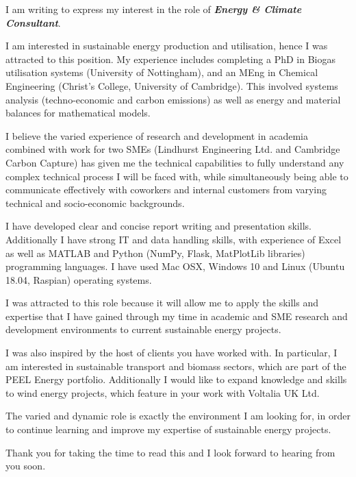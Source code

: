\documentclass[11pt,a4paper]{SandyCV} %
\begin{document}
\makeCoverLetterName

\makelettertitle %

\begin{cvletter} %

\hspace{2.8cm} I am writing to express my interest in the role of \emph{\bf Energy \& Climate Consultant}. 

I am interested in sustainable energy production and utilisation, hence I was attracted to this position.
My experience includes completing a PhD in Biogas utilisation systems (University of Nottingham), and an MEng in Chemical Engineering (Christ's College, University of Cambridge).
This involved systems analysis (techno-economic and carbon emissions) as well as energy and material balances for mathematical models.

I believe the varied experience of research and development in academia combined with work for two SMEs (Lindhurst Engineering Ltd. and Cambridge Carbon Capture) has given me the technical capabilities to fully understand any complex technical process I will be faced with, while simultaneously being able to communicate effectively with coworkers and internal customers from varying technical and socio-economic backgrounds.

I have developed clear and concise report writing and presentation skills.
Additionally I have strong IT and data handling skills, with experience of Excel as well as MATLAB and Python (NumPy, Flask, MatPlotLib libraries) programming languages.
I have used Mac OSX, Windows 10 and Linux (Ubuntu 18.04, Raspian) operating systems.

I was attracted to this role because it will allow me to apply the skills and expertise that I have gained through my time in academic and SME research and development environments to current sustainable energy projects.

I was also inspired by the host of clients you have worked with.
In particular, I am interested in sustainable transport and biomass sectors, which are part of the PEEL Energy portfolio.
Additionally I would like to expand knowledge and skills to wind energy projects, which feature in your work with Voltalia UK Ltd.  

The varied and dynamic role is exactly the environment I am looking for, in order to continue learning and improve my expertise of sustainable energy projects.
  
\end{cvletter}

Thank you for taking the time to read this and I look forward to hearing from you soon.

\makeletterclosing
\end{document}
